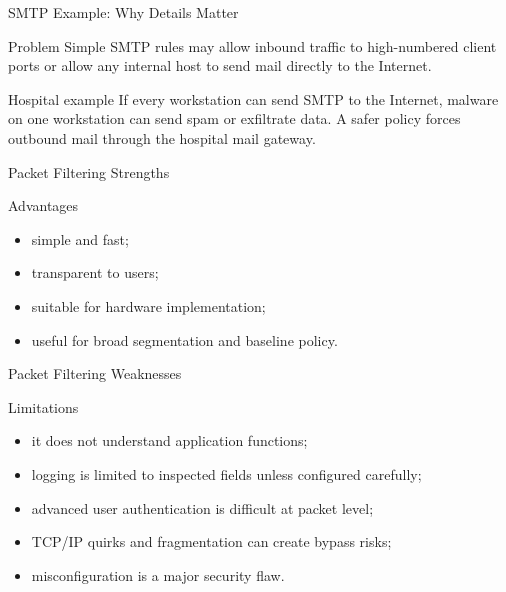\documentclass[presentation]{beamer}
\begin{document}
\begin{frame}[c]{SMTP Example: Why Details Matter}
\begin{block}{Problem}
Simple SMTP rules may allow inbound traffic to high-numbered client ports or allow any internal host
to send mail directly to the Internet.
\end{block}

\begin{exampleblock}{Hospital example}
If every workstation can send SMTP to the Internet, malware on one workstation can send spam or
exfiltrate data. A safer policy forces outbound mail through the hospital mail gateway.
\end{exampleblock}
\end{frame}

\begin{frame}[c]{Packet Filtering Strengths}
\begin{block}{Advantages}
\begin{itemize}
    \item simple and fast;
    \item transparent to users;
    \item suitable for hardware implementation;
    \item useful for broad segmentation and baseline policy.
\end{itemize}
\end{block}
\end{frame}

\begin{frame}[c]{Packet Filtering Weaknesses}
\begin{block}{Limitations}
\begin{itemize}
    \item it does not understand application functions;
    \item logging is limited to inspected fields unless configured carefully;
    \item advanced user authentication is difficult at packet level;
    \item TCP/IP quirks and fragmentation can create bypass risks;
    \item misconfiguration is a major security flaw.
\end{itemize}
\end{block}
\end{frame}
\end{document}

